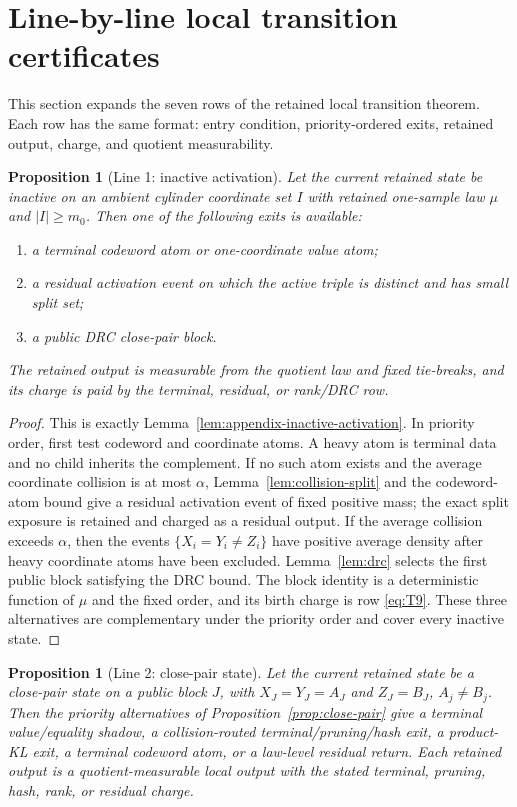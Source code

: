 \documentclass[11pt]{article}
\newtheorem{proposition}[theorem]{Proposition}
\theoremstyle{remark}
\begin{document}
\section{Line-by-line local transition certificates}\label{sec:line-certificates}

This section expands the seven rows of the retained local transition theorem.  Each row has the same format: entry condition, priority-ordered exits, retained output, charge, and quotient measurability.

\begin{proposition}[Line 1: inactive activation]\label{prop:line-inactive}
Let the current retained state be inactive on an ambient cylinder coordinate set $I$ with retained one-sample law $\mu$ and $|I|\ge m_0$.  Then one of the following exits is available:
\begin{enumerate}[label=\textup{(\roman*)}]
\item a terminal codeword atom or one-coordinate value atom;
\item a residual activation event on which the active triple is distinct and has small split set;
\item a public DRC close-pair block.
\end{enumerate}
The retained output is measurable from the quotient law and fixed tie-breaks, and its charge is paid by the terminal, residual, or rank/DRC row.
\end{proposition}

\begin{proof}
This is exactly Lemma~\ref{lem:appendix-inactive-activation}.  In priority order, first test codeword and coordinate atoms.  A heavy atom is terminal data and no child inherits the complement.  If no such atom exists and the average coordinate collision is at most $\alpha$, Lemma~\ref{lem:collision-split} and the codeword-atom bound give a residual activation event of fixed positive mass; the exact split exposure is retained and charged as a residual output.  If the average collision exceeds $\alpha$, then the events $\{X_i=Y_i\ne Z_i\}$ have positive average density after heavy coordinate atoms have been excluded.  Lemma~\ref{lem:drc} selects the first public block satisfying the DRC bound.  The block identity is a deterministic function of $\mu$ and the fixed order, and its birth charge is row \eqref{eq:T9}.  These three alternatives are complementary under the priority order and cover every inactive state.
\end{proof}

\begin{proposition}[Line 2: close-pair state]\label{prop:line-close-pair}
Let the current retained state be a close-pair state on a public block $J$, with $X_J=Y_J=A_J$ and $Z_J=B_J$, $A_j\ne B_j$.  Then the priority alternatives of Proposition~\ref{prop:close-pair} give a terminal value/equality shadow, a collision-routed terminal/pruning/hash exit, a product-KL exit, a terminal codeword atom, or a law-level residual return.  Each retained output is a quotient-measurable local output with the stated terminal, pruning, hash, rank, or residual charge.
\end{proposition}
\end{document}
